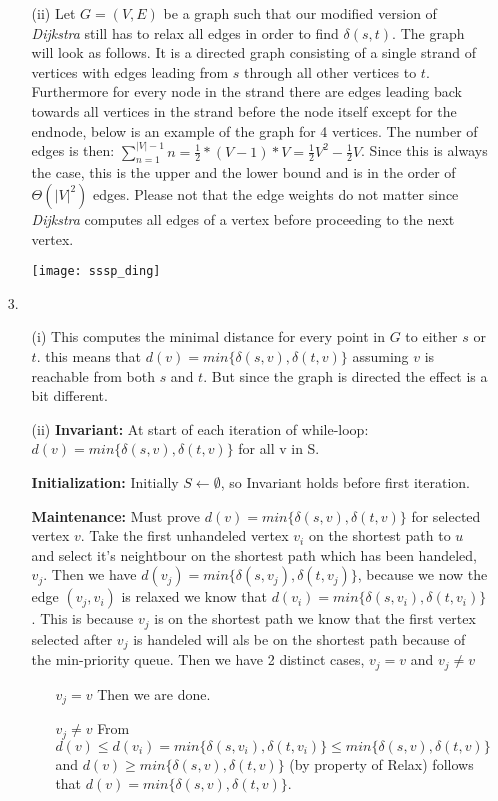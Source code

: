 \documentclass{article}
\begin{document}
\begin{itemize}
\begin{itemize}
\item[(ii)] Let $G=(V,E)$ be a graph such that our modified version of \emph{Dijkstra} still has to relax all edges in order to find $\delta(s,t)$. The graph will look as follows. It is a directed graph consisting of a single strand of vertices with edges leading from $s$ through all other vertices to $t$. Furthermore for every node in the strand there are edges leading back towards all vertices in the strand before the node itself except for the endnode, below is an example of the graph for 4 vertices. The number of edges is then: $\sum_{n=1}^{|V|-1}n=\frac{1}{2}*(V-1)*V =\frac{1}{2}V^2-\frac{1}{2}V$. Since this is always the case, this is the upper and the lower bound and is in the order of $\Theta(|V|^2)$ edges. Please not that the edge weights do not matter since \emph{Dijkstra} computes all edges of a vertex before proceeding to the next vertex.

\centerline{\texttt{[image: sssp\_ding]}}
\end{itemize}

\item[3.] 
\begin{itemize}
\item[(i)] This computes the minimal distance for every point in $G$ to either $s$ or $t$. this means that $d(v)=min\{\delta(s,v),\delta(t,v)\}$ assuming $v$ is reachable from both $s$ and $t$. But since the graph is directed the effect is a bit different. 

\item[(ii)] \textbf{Invariant:} At start of each iteration of while-loop: $d(v) = min\{\delta(s,v),\delta(t,v)\}$ for all v in S.

\textbf{Initialization:} Initially $S\gets \emptyset$, so Invariant holds before first iteration.

\textbf{Maintenance:} Must prove $d(v) = min\{\delta(s,v),\delta(t,v)\}$ for selected vertex $v$. Take the first unhandeled vertex $v_i$ on the shortest path to $u$ and select it's neightbour on the shortest path which has been handeled, $v_j$. Then we have $d(v_j)=min\{\delta(s,v_j),\delta(t,v_j)\}$, because we now the edge $(v_j,v_i)$ is relaxed we know that $d(v_i)=min\{\delta(s,v_i),\delta(t,v_i)\}$. This is because $v_j$ is on the shortest path we know that the first vertex selected after $v_j$ is handeled will als be on the shortest path because of the min-priority queue. Then we have 2 distinct cases, $v_j=v$ and $v_j\ne v$

\begin{itemize}
\item[$v_j=v$] Then we are done.

\item[$v_j\ne v$] From $d(v) \le d(v_i) = min\{\delta(s,v_i),\delta(t,v_i)\} \le min\{\delta(s,v),\delta(t,v)\}$ and $d(v)\ge min\{\delta(s,v),\delta(t,v)\}$ (by property of Relax) follows that $d(v)=min\{\delta(s,v),\delta(t,v)\}$.
\end{itemize}


\end{itemize}
\end{itemize}
\end{document}
